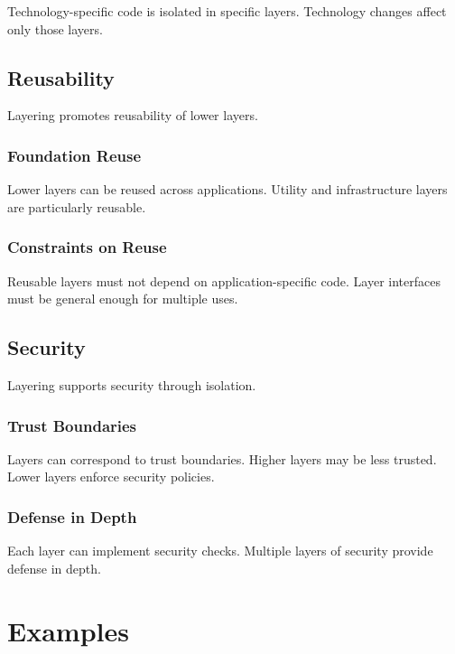 \documentclass[11pt]{article}
\begin{document}
Technology-specific code is isolated in specific layers. Technology changes affect only those layers.

\subsection{Reusability}

Layering promotes reusability of lower layers.

\subsubsection{Foundation Reuse}

Lower layers can be reused across applications. Utility and infrastructure layers are particularly reusable.

\subsubsection{Constraints on Reuse}

Reusable layers must not depend on application-specific code. Layer interfaces must be general enough for multiple uses.

\subsection{Security}

Layering supports security through isolation.

\subsubsection{Trust Boundaries}

Layers can correspond to trust boundaries. Higher layers may be less trusted. Lower layers enforce security policies.

\subsubsection{Defense in Depth}

Each layer can implement security checks. Multiple layers of security provide defense in depth.

\section{Examples}
\end{document}
